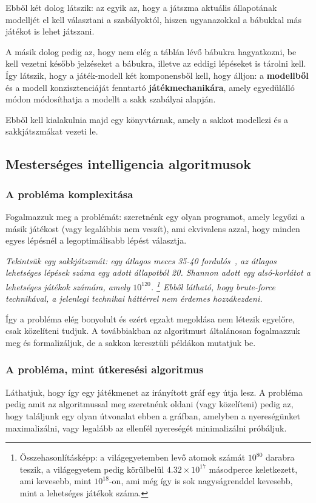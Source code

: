 \documentclass[twoside, a4paper, 12pt]{article}
\begin{document}
Ebből két dolog látszik: az egyik az, hogy a játszma aktuális állapotának modelljét el kell választani a szabályoktól, hiszen ugyanazokkal a bábukkal más játékot is lehet játszani.

A másik dolog pedig az, hogy nem elég a táblán lévő bábukra hagyatkozni, be kell vezetni később jelzéseket a bábukra, illetve az eddigi lépéseket is tárolni kell. Így látszik, hogy a játék-modell két komponensből kell, hogy álljon: a \textbf{modellből} és a modell konzisztenciáját fenntartó \textbf{játékmechanikára}, amely egyedülálló módon módosíthatja a modellt a sakk szabályai alapján.

Ebből kell kialakulnia majd egy könyvtárnak, amely a sakkot modellezi és a sakkjátszmákat vezeti le.

\subsection{Mesterséges intelligencia algoritmusok}
\subsubsection{A probléma komplexitása}
Fogalmazzuk meg a problémát: szeretnénk egy olyan programot, amely legyőzi a másik játékost (vagy legalábbis nem veszít), ami ekvivalens azzal, hogy minden egyes lépésnél a legoptimálisabb lépést választja.

\textit{Tekintsük egy sakkjátszmát: egy átlagos meccs 35-40 fordulós~\cite{averageLengthOfChessGame}\cite{averageLengthOfChessGame2}\cite{chessStatistics}, az átlagos lehetséges lépések száma egy adott állapotból 20\cite{shannonnumber}. Shannon adott egy alsó-korlátot a lehetséges játékok számára, amely $10^{120}$. \footnote{Összehasonlításképp: a világegyetemben levő atomok számát $10^{80}$ darabra teszik, a világegyetem pedig körülbelül $4.32 \times 10^{17}$ másodperce keletkezett, ami kevesebb, mint $10^{18}$-on, ami még így is sok nagyságrenddel kevesebb, mint a lehetséges játékok száma.} Ebből látható, hogy \textit{brute-force} technikával, a jelenlegi technikai háttérrel nem érdemes hozzákezdeni.}

Így a probléma elég bonyolult és ezért egzakt megoldása nem létezik egyelőre, csak közelíteni tudjuk. A továbbiakban az algoritmust általánosan fogalmazzuk meg és formalizáljuk, de a sakkon keresztüli példákon mutatjuk be.

\subsubsection{A probléma, mint útkeresési algoritmus}
Láthatjuk, hogy így egy játékmenet az irányított gráf egy útja lesz. A probléma pedig amit az algoritmussal meg szeretnénk oldani (vagy közelíteni) pedig az, hogy találjunk egy olyan útvonalat ebben a gráfban, amelyben a nyereségünket maximalizálni, vagy legalább az ellenfél nyereségét minimalizálni próbáljuk.
\end{document}
